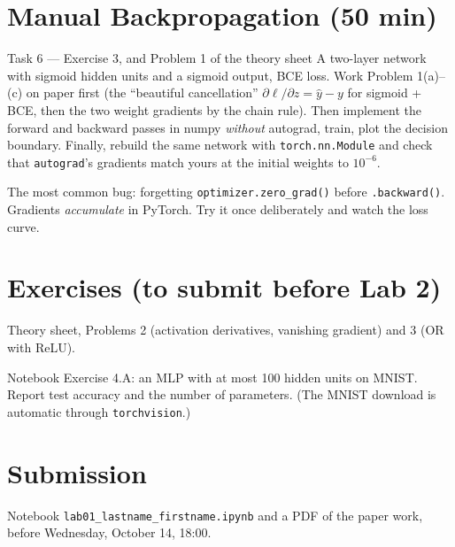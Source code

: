 \documentclass[11pt]{article}
\begin{document}
\section{Manual Backpropagation (50 min)}
\begin{task}{Task 6 --- Exercise 3, and Problem 1 of the theory sheet}
A two-layer network with sigmoid hidden units and a sigmoid output, BCE loss. Work Problem 1(a)--(c)
on paper first (the ``beautiful cancellation'' $\partial\ell/\partial z=\hat y-y$ for sigmoid + BCE, then
the two weight gradients by the chain rule). Then implement the forward and backward passes in numpy
\emph{without} autograd, train, plot the decision boundary. Finally, rebuild the same network with
\texttt{torch.nn.Module} and check that \texttt{autograd}'s gradients match yours at the initial weights
to $10^{-6}$.
\end{task}
\begin{caution}
The most common bug: forgetting \texttt{optimizer.zero\_grad()} before \texttt{.backward()}. Gradients
\emph{accumulate} in PyTorch. Try it once deliberately and watch the loss curve.
\end{caution}

\section{Exercises (to submit before Lab 2)}
\begin{exercise}
Theory sheet, Problems 2 (activation derivatives, vanishing gradient) and 3 (OR with ReLU).
\end{exercise}
\begin{exercise}
Notebook Exercise 4.A: an MLP with at most 100 hidden units on MNIST. Report test accuracy and the
number of parameters. (The MNIST download is automatic through \texttt{torchvision}.)
\end{exercise}

\section*{Submission}
Notebook \texttt{lab01\_lastname\_firstname.ipynb} and a PDF of the paper work, before Wednesday, October 14, 18:00.
\end{document}
